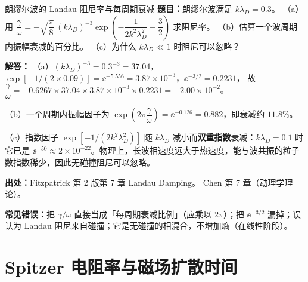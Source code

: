 \begin{example}{朗缪尔波的 Landau 阻尼率与每周期衰减}{}
\textbf{题目：}朗缪尔波满足 $k\lambda_D=0.3$。
（a）用 $\dfrac{\gamma}{\omega}=-\sqrt{\dfrac{\pi}{8}}\,(k\lambda_D)^{-3}
\exp\!\left(-\dfrac{1}{2k^2\lambda_D^2}-\dfrac{3}{2}\right)$ 求阻尼率。
（b）估算一个波周期内振幅衰减的百分比。
（c）为什么 $k\lambda_D\ll1$ 时阻尼可以忽略？

\textbf{解答：}
（a）$(k\lambda_D)^{-3}=0.3^{-3}=37.04$，
$\exp[-1/(2\times0.09)]=\ee^{-5.556}=3.87\times10^{-3}$，$\ee^{-3/2}=0.2231$，
故 $\dfrac{\gamma}{\omega}=-0.6267\times37.04\times3.87\times10^{-3}\times0.2231=-2.00\times10^{-2}$。

（b）一个周期内振幅因子为 $\exp\!\left(2\pi\dfrac{\gamma}{\omega}\right)=\ee^{-0.126}=0.882$，即衰减约 $11.8\%$。

（c）指数因子 $\exp[-1/(2k^2\lambda_D^2)]$ 随 $k\lambda_D$ 减小而\textbf{双重指数}衰减：$k\lambda_D=0.1$ 时它已是 $\ee^{-50}\approx2\times10^{-22}$。物理上，长波相速度远大于热速度，能与波共振的粒子数指数稀少，因此无碰撞阻尼可以忽略。

{\footnotesize
\textbf{出处：}Fitzpatrick 第 2 版第 7 章 Landau Damping。
Chen 第 7 章（动理学理论）。
}

\textbf{常见错误：}把 $\gamma/\omega$ 直接当成「每周期衰减比例」（应乘以 $2\pi$）；把 $\ee^{-3/2}$ 漏掉；误认为 Landau 阻尼来自碰撞；它是无碰撞的相混合，不增加熵（在线性阶段）。
\end{example}


\section{Spitzer 电阻率与磁场扩散时间}

